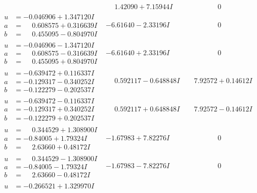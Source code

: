\documentclass[1p]{elsarticle_modified}
\theoremstyle{definition}
\begin{document}
$$\begin{array}{c|c|c}
 & \phantom{-}1.42090 + 7.15944 I & \phantom{-0.000000 } 0 \\ \hline\begin{aligned}
u &= -0.046906 + 1.347120 I \\
a &= \phantom{-}0.608575 + 0.316639 I \\
b &= \phantom{-}0.455095 - 0.804970 I\end{aligned}
 & -6.61640 - 2.33196 I & \phantom{-0.000000 } 0 \\ \hline\begin{aligned}
u &= -0.046906 - 1.347120 I \\
a &= \phantom{-}0.608575 - 0.316639 I \\
b &= \phantom{-}0.455095 + 0.804970 I\end{aligned}
 & -6.61640 + 2.33196 I & \phantom{-0.000000 } 0 \\ \hline\begin{aligned}
u &= -0.639472 + 0.116337 I \\
a &= -0.129317 - 0.340252 I \\
b &= -0.122279 - 0.202537 I\end{aligned}
 & \phantom{-}0.592117 - 0.648848 I & \phantom{-}7.92572 + 0.14612 I \\ \hline\begin{aligned}
u &= -0.639472 - 0.116337 I \\
a &= -0.129317 + 0.340252 I \\
b &= -0.122279 + 0.202537 I\end{aligned}
 & \phantom{-}0.592117 + 0.648848 I & \phantom{-}7.92572 - 0.14612 I \\ \hline\begin{aligned}
u &= \phantom{-}0.344529 + 1.308900 I \\
a &= -0.84005 + 1.79324 I \\
b &= \phantom{-}2.63660 + 0.48172 I\end{aligned}
 & -1.67983 + 7.82276 I & \phantom{-0.000000 } 0 \\ \hline\begin{aligned}
u &= \phantom{-}0.344529 - 1.308900 I \\
a &= -0.84005 - 1.79324 I \\
b &= \phantom{-}2.63660 - 0.48172 I\end{aligned}
 & -1.67983 - 7.82276 I & \phantom{-0.000000 } 0 \\ \hline\begin{aligned}
u &= -0.266521 + 1.329970 I \\

\end{aligned}
\end{array}$$
\end{document}
